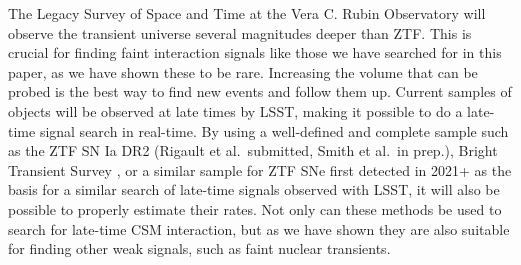 \documentclass[a4paper,oneside,12pt, class=Latex/Classes/PhDthesisPSnPDF, crop=false]{standalone}
\begin{document}
The Legacy Survey of Space and Time \cite[LSST;][]{LSST} at the Vera C. Rubin Observatory will observe the transient universe several magnitudes deeper than ZTF. This is crucial for finding faint interaction signals like those we have searched for in this paper, as we have shown these to be rare. Increasing the volume that can be probed is the best way to find new events and follow them up. Current samples of objects will be observed at late times by LSST, making it possible to do a late-time signal search in real-time. By using a well-defined and complete sample such as the ZTF SN Ia DR2 (Rigault et al.~submitted, Smith et al.~in prep.), Bright Transient Survey \cite[BTS;][]{BTS_I, BTS_II}, or a similar sample for ZTF SNe first detected in 2021+ as the basis for a similar search of late-time signals observed with LSST, it will also be possible to properly estimate their rates. Not only can these methods be used to search for late-time CSM interaction, but as we have shown they are also suitable for finding other weak signals, such as faint nuclear transients.
\end{document}
